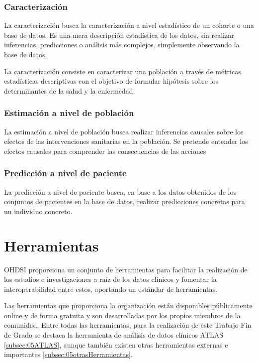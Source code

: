 \subsubsection{Caracterización}

La caracterización busca la caracterización a nivel estadístico de un cohorte o una base de datos. Es una mera descripción estadística de los datos, sin realizar inferencias, predicciones o análisis más complejos, simplemente observando la base de datos.

La caracterización consiste en caracterizar una población a través de métricas estadísticas descriptivas con el objetivo de formular hipótesis sobre los determinantes de la salud y la enfermedad.

\subsubsection{Estimación a nivel de población}

La estimación a nivel de población busca realizar inferencias causales sobre los efectos de las intervenciones sanitarias en la población. Se pretende entender los efectos causales para comprender las consecuencias de las acciones

\subsubsection{Predicción a nivel de paciente}

La predicción a nivel de paciente busca, en base a los datos obtenidos de los conjuntos de pacientes en la base de datos, realizar predicciones concretas para un individuo concreto.

\section{Herramientas} \label{sec:05herramientas}

OHDSI proporciona un conjunto de herramientas para facilitar la realización de los estudios e investigaciones a raíz de los datos clínicos y fomentar la interoperabilidad entre estos, aportando un estándar de herramientas. 

Las herramientas que proporciona la organización están disponibles públicamente online y de forma gratuita y son desarrolladas por los propios miembros de la comunidad. Entre todas las herramientas, para la realización de este Trabajo Fin de Grado se destaca la herramienta de análisis de datos clínicos ATLAS \ref{subsec:05ATLAS}, aunque también existen otras herramientas externas e importantes \ref{subsec:05otrasHerramientas}.

